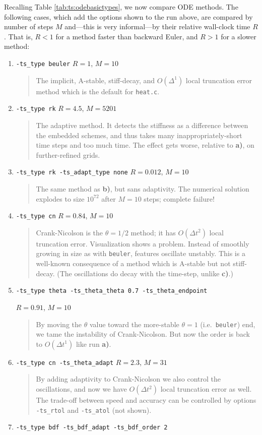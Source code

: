 Recalling Table \ref{tab:ts:odebasictypes}, we now compare ODE methods.  The following cases, which add the options shown to the run above, are compared by number of steps $M$ and---this is very informal---by their relative wall-clock time $R$.  That is, $R<1$ for a method faster than backward Euler, and $R>1$ for a slower method:
\renewcommand{\labelenumi}{\textbf{\alph{enumi})}}
\begin{enumerate}
\item \texttt{-ts\_type beuler}  \hfill $R=1$, $M=10$
\begin{quote} The implicit, A-stable, stiff-decay, and $O(\Delta^1)$ local truncation error method which is the default for \texttt{heat.c}. \end{quote}
\item \texttt{-ts\_type rk}  \hfill $R=4.5$, $M=5201$
\begin{quote} The \RKthreebs adaptive method.  It detects the stiffness as a difference between the embedded schemes, and thus takes many inappropriately-short time steps and too much time.  The effect gets worse, relative to \textbf{a)}, on further-refined grids. \end{quote}
\item \texttt{-ts\_type rk -ts\_adapt\_type none}  \hfill $R=0.012$, $M=10$
\begin{quote} The same method as \textbf{b)}, but sans adaptivity.  The numerical solution explodes to size $10^{72}$ after $M=10$ steps; complete failure!\end{quote}
\item \texttt{-ts\_type cn}  \hfill $R=0.84$, $M=10$
\begin{quote} Crank-Nicolson is the $\theta=1/2$ method; it has $O(\Delta t^2)$ local truncation error.  Visualization shows a problem.  Instead of smoothly growing in size as with \texttt{beuler}, features oscillate unstably.  This is a well-known consequence of a method which is A-stable but not stiff-decay.  (The oscillations do decay with the time-step, unlike \textbf{c)}.) \end{quote}
\item \texttt{-ts\_type theta -ts\_theta\_theta 0.7 -ts\_theta\_endpoint}

\hfill $R=0.91$, $M=10$
\begin{quote} By moving the $\theta$ value toward the more-stable $\theta=1$ (i.e.~\texttt{beuler}) end, we tame the instability of Crank-Nicolson.  But now the order is back to $O(\Delta t^1)$ like run \textbf{a)}. \end{quote}
\item \texttt{-ts\_type cn -ts\_theta\_adapt}  \hfill $R=2.3$, $M=31$
\begin{quote} By adding adaptivity to Crank-Nicolson we also control the oscillations, and now we have $O(\Delta t^2)$ local truncation error as well.  The trade-off between speed and accuracy can be controlled by options \texttt{-ts\_rtol} and \texttt{-ts\_atol} (not shown).  \end{quote}
\item \texttt{-ts\_type bdf -ts\_bdf\_adapt -ts\_bdf\_order 2}


\end{enumerate}
